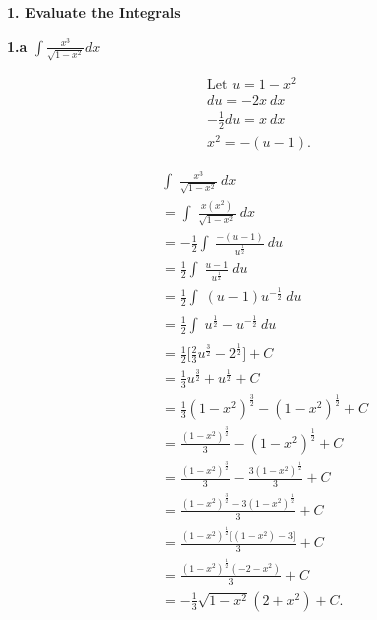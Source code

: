 \documentclass{report}
\begin{document}
    \bigbreak \noindent \bigbreak \noindent 
    \textbf{1. Evaluate the Integrals}
    \bigbreak \noindent 
    \begin{mdframed}
        \textbf{1.a} $\int \frac{x^{3}}{\sqrt{1-x^{2}}} dx$
    \end{mdframed}
    \bigbreak \noindent 
    \begin{minipage}[t]{0.47\textwidth}
    \begin{align*}
        \text{Let $u=1-x^{2}$} \\
        du = -2x\ dx \\
        -\frac{1}{2}du = x\ dx \\
        x^{2} = -(u-1)
    .\end{align*}
    \end{minipage}
    \begin{minipage}[t]{0.37\textwidth}
    \begin{align*}
        &\int_{}^{}\ \frac{x^{3}}{\sqrt{1-x^{2}}}\ dx \\
        &=\int_{}^{}\ \frac{x(x^{2})}{\sqrt{1-x^{2}}}\ dx \\
        &=-\frac{1}{2}\int_{}^{}\ \frac{-(u-1)}{u^{\frac{1}{2}}}\ du \\
        &=\frac{1}{2}\int_{}^{}\ \frac{u-1}{u^{\frac{1}{2}}}\ du \\
        &=\frac{1}{2}\int_{}^{}\ (u-1)u^{-\frac{1}{2}}\ du \\
        &=\frac{1}{2}\int_{}^{}\ u^{\frac{1}{2}} - u^{-\frac{1}{2}}\ du \\
        &=\frac{1}{2}\bigg[\frac{2}{3}u^{\frac{3}{2}}-2^{\frac{1}{2}}\bigg] + C\\
        &=\frac{1}{3}u^{\frac{3}{2}} + u^{\frac{1}{2}} + C \\
        &= \frac{1}{3}(1-x^{2})^{\frac{3}{2}}-(1-x^{2})^{\frac{1}{2}}+ C \\
        &=\frac{(1-x^{2})^{\frac{3}{2}}}{3}-(1-x^{2})^{\frac{1}{2}} + C \\
        &=\frac{(1-x^{2})^{\frac{3}{2}}}{3} - \frac{3(1-x^{2})^{\frac{1}{2}}}{3} +C\\
        &= \frac{(1-x^{2})^{\frac{3}{2}}-3(1-x^{2})^{\frac{1}{2}}}{3} +C\\
        &= \frac{(1-x^{2})^{\frac{1}{2}}\big[(1-x^{2})-3\big]}{3} +C\\
        &= \frac{(1-x^{2})^{\frac{1}{2}}(-2-x^{2})}{3}+ C \\
        &= -\frac{1}{3}\sqrt{1-x^{2}}(2+x^{2}) + C
    .\end{align*}
    \end{minipage}
\end{document}
